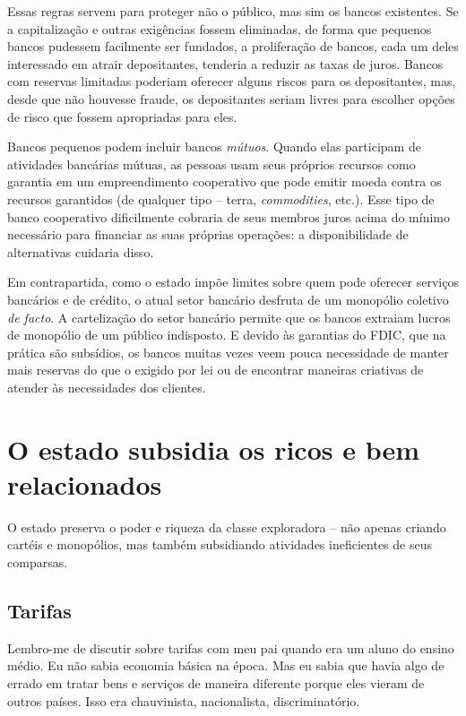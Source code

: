 Essas regras servem para proteger não o público, mas sim os bancos existentes. Se a capitalização e outras exigências fossem eliminadas, de forma que pequenos bancos pudessem facilmente ser fundados, a proliferação de bancos, cada um deles interessado em atrair depositantes, tenderia a reduzir as taxas de juros. Bancos com reservas limitadas poderiam oferecer alguns riscos para os depositantes, mas, desde que não houvesse fraude, os depositantes seriam livres para escolher opções de risco que fossem apropriadas para eles.

Bancos pequenos podem incluir bancos \emph{mútuos}. Quando elas participam de atividades bancárias mútuas, as pessoas usam seus próprios recursos como garantia em um empreendimento cooperativo que pode emitir moeda contra os recursos garantidos (de qualquer tipo -- terra, \emph{commodities}, etc.). Esse tipo de banco cooperativo dificilmente cobraria de seus membros juros acima do mínimo necessário para financiar as suas próprias operações: a disponibilidade de alternativas cuidaria disso.

Em contrapartida, como o estado impõe limites sobre quem pode oferecer serviços bancários e de crédito, o atual setor bancário desfruta de um monopólio coletivo \emph{de facto}. A cartelização do setor bancário permite que os bancos extraiam lucros de monopólio de um público indisposto. E devido às garantias do FDIC, que na prática são subsídios, os bancos muitas vezes veem pouca necessidade de manter mais reservas do que o exigido por lei ou de encontrar maneiras criativas de atender às necessidades dos clientes.

\section{O estado subsidia os ricos e bem relacionados}

O estado preserva o poder e riqueza da classe exploradora -- não apenas criando cartéis e monopólios, mas também subsidiando atividades ineficientes de seus comparsas.

\subsection*{Tarifas}

Lembro-me de discutir sobre tarifas com meu pai quando era um aluno do ensino médio. Eu não sabia economia básica na época. Mas eu sabia que havia algo de errado em tratar bens e serviços de maneira diferente porque eles vieram de outros países. Isso era chauvinista, nacionalista, discriminatório.

